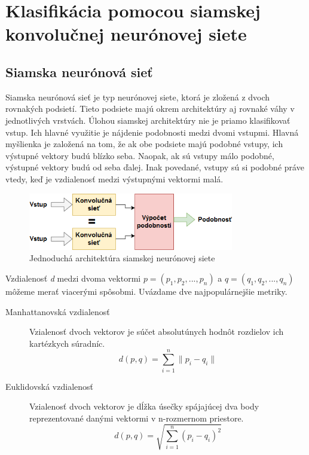 \chapter{Klasifikácia pomocou siamskej konvolučnej neurónovej siete}
\label{kap:siamese}
\section{Siamska neurónová sieť}
Siamska neurónová sieť je typ neurónovej siete, ktorá je zložená z dvoch rovnakých podsietí. 
Tieto podsiete majú okrem architektúry aj rovnaké váhy v jednotlivých vrstvách.
Úlohou siamskej architektúry nie je priamo klasifikovať vstup.
Ich hlavné využitie je nájdenie podobnosti medzi dvomi vstupmi.
Hlavná myšlienka je založená na tom, že ak obe podsiete majú podobné vstupy, ich výstupné vektory budú blízko seba.
Naopak, ak sú vstupy málo podobné, výstupné vektory budú od seba ďalej.
Inak povedané, vstupy sú si podobné práve vtedy, keď je vzdialenosť medzi výstupnými vektormi malá.

\begin{figure}[H]
\centerline{\includegraphics[width=0.8\textwidth]{images/siamese_diagram}}
\caption[Siamska neurónová sieť]{Jednoduchá architektúra siamskej neurónovej siete}
\label{obr:siamese_diagram}
\end{figure}

Vzdialenosť \textit{d} medzi dvoma vektormi $p = (p_1, p_2, ..., p_n)$ a $q = (q_1, q_2, ..., q_n)$ 
môžeme merať viacerými spôsobmi. Uvázdame dve najpopulárnejšie metriky.

\begin{description}
\item[Manhattanovská vzdialenosť]
Vzialenosť dvoch vektorov je súčet absolutúnych hodnôt rozdielov ich kartézkych súradníc.
$$d(p, q) = \sum_{i=1}^{n} \| p_i - q_i \|$$

\item[Euklidovská vzdialenosť]
Vzialenosť dvoch vektorov je dĺžka úsečky spájajúcej dva body reprezentované danými vektormi v n-rozmernom priestore.
$$d(p, q) = \sqrt{ \sum_{i=1}^{n} ( p_i - q_i )^2}$$
\end{description}


